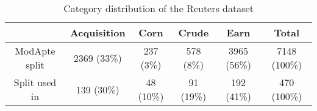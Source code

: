 \begin{table}[h]
\centering
\begin{tabular}{c|c|c|c|c|c}
                                & Acquisition & Corn      & Crude     & Earn        & Total        \\ \hline
  ModApte split                 & 2369 (33\%) & 237 (3\%) & 578 (8\%) & 3965 (56\%) & 7148 (100\%) \\
  Split used in \cite{ssk}      & 139 (30\%)  & 48 (10\%) & 91 (19\%) & 192 (41\%)  & 470 (100\%)  \\
\end{tabular}
\caption{Category distribution of the Reuters dataset}
\label{tab:reuters}
\end{table}

